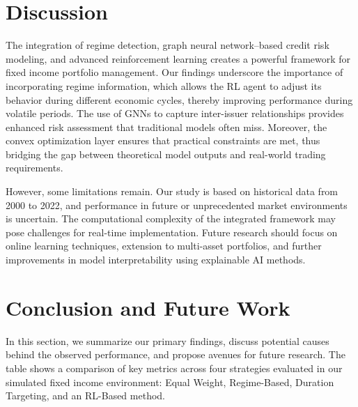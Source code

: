 \documentclass[
  a4paper,
  10pt,
  unnumberedsections,
  twoside,
]{LTJournalArticle}
\begin{document}
\section{Discussion}
The integration of regime detection, graph neural network–based credit risk modeling, and advanced reinforcement learning creates a powerful framework for fixed income portfolio management. Our findings underscore the importance of incorporating regime information, which allows the RL agent to adjust its behavior during different economic cycles, thereby improving performance during volatile periods. The use of GNNs to capture inter-issuer relationships provides enhanced risk assessment that traditional models often miss. Moreover, the convex optimization layer ensures that practical constraints are met, thus bridging the gap between theoretical model outputs and real-world trading requirements.

However, some limitations remain. Our study is based on historical data from 2000 to 2022, and performance in future or unprecedented market environments is uncertain. The computational complexity of the integrated framework may pose challenges for real-time implementation. Future research should focus on online learning techniques, extension to multi-asset portfolios, and further improvements in model interpretability using explainable AI methods. 

\section{Conclusion and Future Work}

In this section, we summarize our primary findings, discuss potential causes behind the observed performance, and propose avenues for future research. The table shows a comparison of key metrics across four strategies evaluated in our simulated fixed income environment: Equal Weight, Regime-Based, Duration Targeting, and an RL-Based method.
\end{document}
